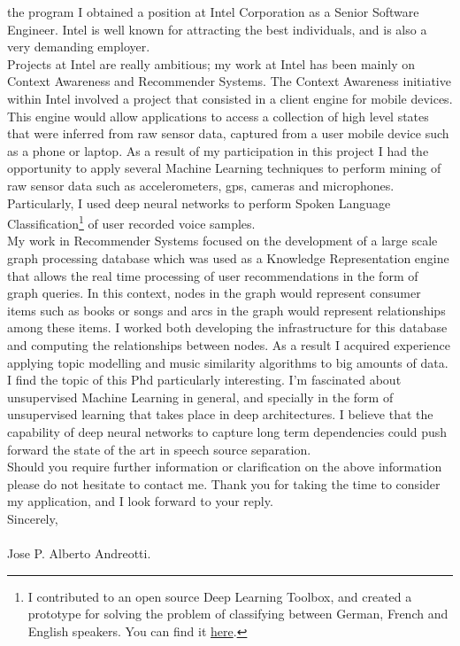 \documentclass[letter,12pt,english]{article}
\begin{document}
the program I obtained a position at Intel Corporation as a Senior Software Engineer. 
Intel is well known for attracting the best individuals, and is also a very demanding employer.
\\
Projects at Intel are really ambitious; my work at Intel has been mainly on Context Awareness and 
Recommender Systems. The Context Awareness initiative within Intel involved a project that consisted
in a client engine for mobile devices. This engine would allow applications to access a collection 
of high level states that were inferred from raw sensor data, captured from a user mobile device such
as a phone or laptop.
As a result of my participation in this project I had the opportunity to apply several Machine Learning
techniques to perform mining of raw sensor data such as accelerometers, gps, cameras and microphones.
Particularly, I used deep neural networks to perform Spoken Language Classification\footnote{ I contributed to an 
open source Deep Learning Toolbox, and created a prototype for solving the problem of classifying between 
German, French and English speakers.  You can find it \href{https://github.com/albertoandreottiATgmail/DeepLearnToolbox/tree/langIdent}{here}.}
of user recorded voice samples.
\\
My work in Recommender Systems focused on the development of a large scale graph processing database which 
was used as a Knowledge Representation engine that allows the real time processing of user recommendations in 
the form of graph queries. In this context, nodes in the graph would represent consumer items such as books or 
songs and arcs in the graph would represent relationships among these items. I worked both developing the 
infrastructure for this database and computing the relationships between nodes. As a result I acquired experience
applying topic modelling and music similarity algorithms to big amounts of data.
\\
I find the topic of this Phd particularly interesting. I'm fascinated about unsupervised Machine Learning in general,
and specially in the form of unsupervised learning that takes place in deep architectures. I believe that the capability
of deep neural networks to capture long term dependencies could push forward the state of the art in speech source separation.\\
Should you require further information or clarification on the above information please do not hesitate to contact me.
Thank you for taking the time to consider my application, and I look forward to your reply.
\\

Sincerely,
\\
\\
Jose P. Alberto Andreotti.
\end{document}
